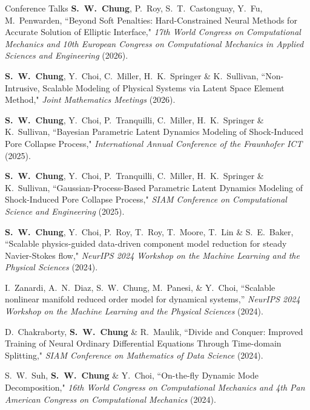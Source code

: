 \documentclass{resume} %
\begin{document}
\begin{rSection}{Conference Talks}
\textbf{S.\ W.\ Chung}, P.\ Roy, S.\ T.\ Castonguay, Y.\ Fu, M.\ Penwarden,    
``Beyond Soft Penalties: Hard-Constrained Neural Methods for Accurate Solution of Elliptic Interface,"
\textit{17th World Congress on Computational Mechanics and 10th European Congress on Computational Mechanics in Applied Sciences and Engineering} (2026).
\par    
\textbf{S.\ W.\ Chung}, Y.\ Choi, C.\ Miller, H.\ K.\ Springer \& K.\ Sullivan,    
``Non-Intrusive, Scalable Modeling of Physical Systems via Latent Space Element Method,"
\textit{Joint Mathematics Meetings} (2026).
\par
\textbf{S.\ W.\ Chung}, Y.\ Choi, P.\ Tranquilli, C.\ Miller, H.\ K.\ Springer \& K.\ Sullivan,
``Bayesian Parametric Latent Dynamics Modeling of Shock-Induced Pore Collapse Process,"
\textit{International Annual Conference of the Fraunhofer ICT} (2025).
\par
\textbf{S.\ W.\ Chung}, Y.\ Choi, P.\ Tranquilli, C.\ Miller, H.\ K.\ Springer \& K.\ Sullivan,
``Gaussian-Process-Based Parametric Latent Dynamics Modeling of Shock-Induced Pore Collapse Process,"
\textit{SIAM Conference on Computational Science and Engineering} (2025).
\par
\textbf{S.\ W.\ Chung}, Y.\ Choi, P.\ Roy, T.\ Roy, T.\ Moore, T.\ Lin \& S.\ E.\ Baker,
``Scalable physics-guided data-driven component model reduction for steady Navier-Stokes flow,"
\textit{NeurIPS 2024 Workshop on the Machine Learning and the Physical Sciences} (2024).
\par
I.\ Zanardi, A.\ N.\ Diaz, S.\ W.\ Chung, M.\ Panesi, \& Y.\ Choi,
``Scalable nonlinear manifold reduced order model for dynamical systems,''
\textit{NeurIPS 2024 Workshop on the Machine Learning and the Physical Sciences} (2024).
\par
D.\ Chakraborty, \textbf{S.\ W.\ Chung} \& R.\ Maulik,
``Divide and Conquer: Improved Training of Neural Ordinary Differential Equations Through Time-domain Splitting,"
\textit{SIAM Conference on Mathematics of Data Science} (2024).
\par
S.\ W.\ Suh, \textbf{S.\ W.\ Chung} \& Y.\ Choi,
``On-the-fly Dynamic Mode Decomposition,"
\textit{16th World Congress on Computational Mechanics and 4th Pan American Congress on Computational Mechanics} (2024).
\par

\end{rSection}
\end{document}
